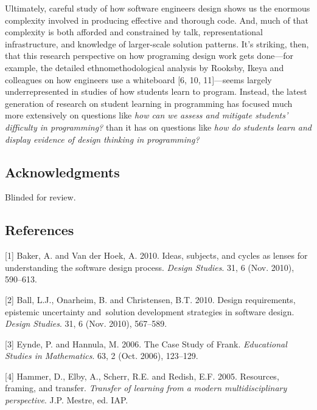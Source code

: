 Ultimately, careful study of how software engineers design shows us the enormous complexity involved in producing effective and thorough code. And, much of that complexity is both afforded and constrained by talk, representational infrastructure, and knowledge of larger-scale solution patterns. It's striking, then, that this research perspective on how programing design work gets done---for example, the detailed ethnomethodological analysis by Rooksby, Ikeya and colleagues on how engineers use a whiteboard {[}6, 10, 11{]}---seems largely underrepresented in studies of how students learn to program. Instead, the latest generation of research on student learning in programming has focused much more extensively on questions like \emph{how can we assess and mitigate students' difficulty in programming?} than it has on questions like \emph{how do students learn and display evidence of design thinking in programming?}

\subsection{Acknowledgments}\label{acknowledgments}

Blinded for review.

\newpage{}

\subsection*{References}\label{references}

\hypertarget{refs}{}
\hypertarget{ref-bakerux5fideasux5f2010}{}
{[}1{]} Baker, A. and Van der Hoek, A. 2010. Ideas, subjects, and cycles as lenses for understanding the software design process. \emph{Design Studies}. 31, 6 (Nov. 2010), 590--613.

\hypertarget{ref-ballux5fdesignux5f2010}{}
{[}2{]} Ball, L.J., Onarheim, B. and Christensen, B.T. 2010. Design requirements, epistemic uncertainty and~solution development strategies in software design. \emph{Design Studies}. 31, 6 (Nov. 2010), 567--589.

\hypertarget{ref-eyndeux5fcaseux5f2006}{}
{[}3{]} Eynde, P. and Hannula, M. 2006. The Case Study of Frank. \emph{Educational Studies in Mathematics}. 63, 2 (Oct. 2006), 123--129.

\hypertarget{ref-hammerux5fresourcesux5f2005}{}
{[}4{]} Hammer, D., Elby, A., Scherr, R.E. and Redish, E.F. 2005. Resources, framing, and transfer. \emph{Transfer of learning from a modern multidisciplinary perspective}. J.P. Mestre, ed. IAP.

